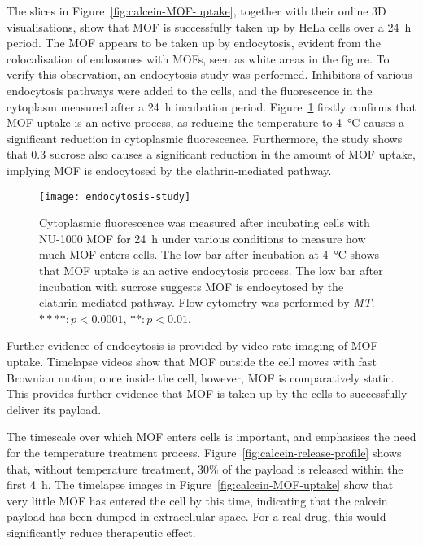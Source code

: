 The slices in Figure~\ref{fig:calcein-MOF-uptake}, together with their online 3D visualisations, show that MOF is successfully taken up by HeLa cells over a \SI{24}{\hour} period. 
The MOF appears to be taken up by endocytosis, evident from the colocalisation of endosomes with MOFs, seen as white areas in the figure. 
To verify this observation, an endocytosis study was performed.
Inhibitors of various endocytosis pathways were added to the cells, and the fluorescence in the cytoplasm measured after a \SI{24}{\hour} incubation period. 
Figure~\ref{fig:endocytosis-study} firstly confirms that MOF uptake is an active process, as reducing the temperature to \SI{4}{\degreeCelsius} causes a significant reduction in cytoplasmic fluorescence. 
Furthermore, the study shows that \SI{0.3}{\Molar} sucrose also causes a significant reduction in the amount of MOF uptake, implying MOF is endocytosed by the clathrin-mediated pathway. 

\begin{figure}[b!]
\centering
\texttt{[image: endocytosis-study]}
\caption[MOFs: An endocytosis study shows NU-1000 MOF is taken up by HeLa cells through the clathrin-mediated pathway]{Cytoplasmic fluorescence was measured after incubating cells with NU-1000 MOF for \SI{24}{\hour} under various conditions to measure how much MOF enters cells. The low bar after incubation at \SI{4}{\degreeCelsius} shows that MOF uptake is an active endocytosis process. The low bar after incubation with sucrose suggests MOF is endocytosed by the clathrin-mediated pathway. Flow cytometry was performed by \textit{MT}. $****: p<0.0001$, $**: p<0.01$. }
\label{fig:endocytosis-study}
\end{figure}

Further evidence of endocytosis is provided by video-rate imaging of MOF uptake.
Timelapse videos show that MOF outside the cell moves with fast Brownian motion; once inside the cell, however, MOF is comparatively static. 
This provides further evidence that MOF is taken up by the cells to successfully deliver its payload. 

The timescale over which MOF enters cells is important, and emphasises the need for the temperature treatment process. 
Figure~\ref{fig:calcein-release-profile} shows that, without temperature treatment, 30\% of the payload is released within the first \SI{4}{\hour}. 
The timelapse images in Figure~\ref{fig:calcein-MOF-uptake} show that very little MOF has entered the cell by this time, indicating that the calcein payload has been dumped in extracellular space. 
For a real drug, this would significantly reduce therapeutic effect. 


